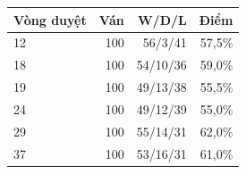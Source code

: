 \begin{center}\small
\begin{tabular}{@{}lrrr@{}}
\toprule
Vòng duyệt & Ván & W/D/L & Điểm \\
\midrule
12 & 100 & 56/3/41 & 57,5\% \\
18 & 100 & 54/10/36 & 59,0\% \\
19 & 100 & 49/13/38 & 55,5\% \\
24 & 100 & 49/12/39 & 55,0\% \\
29 & 100 & 55/14/31 & 62,0\% \\
37 & 100 & 53/16/31 & 61,0\% \\
\bottomrule
\end{tabular}
\end{center}